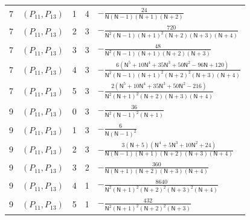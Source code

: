 \documentclass{amsart}
\theoremstyle{definition}
\theoremstyle{remark}
\numberwithin{equation}{section}
\begin{document}
{\begin{longtable}{ccccl}
7&$(P_{11},P_{13})$&1&4&$\displaystyle -\frac{24}{\mathsf N(\mathsf N - 1)(\mathsf N + 1)(\mathsf N + 2)}$\\
7&$(P_{11},P_{13})$&2&3&$\displaystyle -\frac{720}{\mathsf N^{2}(\mathsf N - 1)(\mathsf N + 1)^{2}(\mathsf N + 2)(\mathsf N + 3)(\mathsf N + 4)}$\\
7&$(P_{11},P_{13})$&3&3&$\displaystyle -\frac{48}{\mathsf N^{2}(\mathsf N - 1)(\mathsf N + 1)(\mathsf N + 2)(\mathsf N + 3)}$\\
7&$(P_{11},P_{13})$&4&3&$\displaystyle -\frac{6(\mathsf N^{5} + 10\mathsf N^{4} + 35\mathsf N^{3} + 50\mathsf N^{2} - 96\mathsf N + 120)}{\mathsf N^{2}(\mathsf N - 1)(\mathsf N + 1)^{2}(\mathsf N + 2)^{2}(\mathsf N + 3)(\mathsf N + 4)}$\\
7&$(P_{11},P_{13})$&5&3&$\displaystyle -\frac{2(\mathsf N^{5} + 10\mathsf N^{4} + 35\mathsf N^{3} + 50\mathsf N^{2} - 216)}{\mathsf N^{2}(\mathsf N + 1)^{2}(\mathsf N + 2)(\mathsf N + 3)(\mathsf N + 4)}$\\
9&$(P_{11},P_{13})$&0&3&$\displaystyle -\frac{36}{\mathsf N^{2}(\mathsf N - 1)^{2}(\mathsf N + 1)}$\\
9&$(P_{11},P_{13})$&1&3&$\displaystyle -\frac{6}{\mathsf N(\mathsf N - 1)^{2}}$\\
9&$(P_{11},P_{13})$&2&3&$\displaystyle -\frac{3(\mathsf N + 5)(\mathsf N^{4} + 5\mathsf N^{3} + 10\mathsf N^{2} + 24)}{\mathsf N(\mathsf N - 1)(\mathsf N + 1)(\mathsf N + 2)(\mathsf N + 3)(\mathsf N + 4)}$\\
9&$(P_{11},P_{13})$&3&2&$\displaystyle -\frac{360}{\mathsf N(\mathsf N + 1)(\mathsf N + 2)(\mathsf N + 3)(\mathsf N + 4)}$\\
9&$(P_{11},P_{13})$&4&1&$\displaystyle -\frac{8640}{\mathsf N^{2}(\mathsf N + 1)^{2}(\mathsf N + 2)^{2}(\mathsf N + 3)^{2}(\mathsf N + 4)}$\\
9&$(P_{11},P_{13})$&5&1&$\displaystyle -\frac{432}{\mathsf N^{2}(\mathsf N + 1)^{2}(\mathsf N + 2)^{2}(\mathsf N + 3)}$\\
\end{longtable}}
\end{document}
